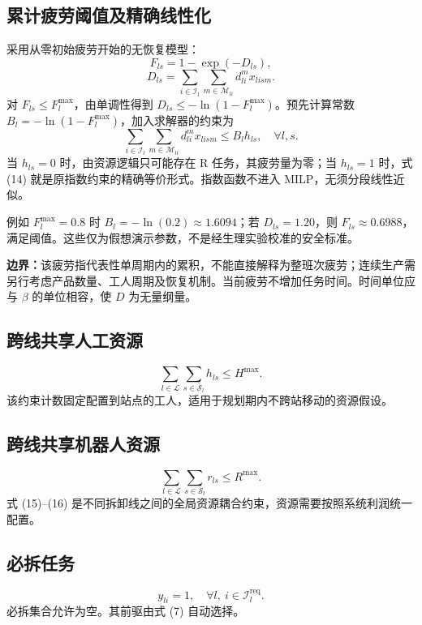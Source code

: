 \documentclass[UTF8,a4paper,11pt]{ctexart}
\begin{document}
\subsection{累计疲劳阈值及精确线性化}
采用从零初始疲劳开始的无恢复模型：
\begin{equation}
F_{ls}=1-\exp(-D_{ls}),\tag{12}
\end{equation}
\begin{equation}
D_{ls}=\sum_{i\in\mathcal I_l}\sum_{m\in\mathcal M_{li}}d_{li}^{m}x_{lism}.\tag{13}
\end{equation}
对 $F_{ls}\leq F_l^{\max}$，由单调性得到 $D_{ls}\leq -\ln(1-F_l^{\max})$。预先计算常数 $B_l=-\ln(1-F_l^{\max})$，加入求解器的约束为
\begin{equation}
\sum_{i\in\mathcal I_l}\sum_{m\in\mathcal M_{li}}d_{li}^{m}x_{lism}
\leq B_lh_{ls},\quad\forall l,s.\tag{14}
\end{equation}
当 $h_{ls}=0$ 时，由资源逻辑只可能存在 R 任务，其疲劳量为零；当 $h_{ls}=1$ 时，式 (14) 就是原指数约束的精确等价形式。指数函数不进入 MILP，无须分段线性近似。

例如 $F_l^{\max}=0.8$ 时 $B_l=-\ln(0.2)\approx1.6094$；若 $D_{ls}=1.20$，则 $F_{ls}\approx0.6988$，满足阈值。这些仅为假想演示参数，不是经生理实验校准的安全标准。

\textbf{边界：}该疲劳指代表性单周期内的累积，不能直接解释为整班次疲劳；连续生产需另行考虑产品数量、工人周期及恢复机制。当前疲劳不增加任务时间。时间单位应与 $\beta$ 的单位相容，使 $D$ 为无量纲量。

\subsection{跨线共享人工资源}
\begin{equation}
\sum_{l\in\mathcal L}\sum_{s\in\mathcal S_l}h_{ls}\leq H^{\max}.\tag{15}
\end{equation}
该约束计数固定配置到站点的工人，适用于规划期内不跨站移动的资源假设。

\subsection{跨线共享机器人资源}
\begin{equation}
\sum_{l\in\mathcal L}\sum_{s\in\mathcal S_l}r_{ls}\leq R^{\max}.\tag{16}
\end{equation}
式 (15)--(16) 是不同拆卸线之间的全局资源耦合约束，资源需要按照系统利润统一配置。

\subsection{必拆任务}
\begin{equation}
y_{li}=1,\quad\forall l,\ i\in\mathcal I_l^{\mathrm{req}}.\tag{17}
\end{equation}
必拆集合允许为空。其前驱由式 (7) 自动选择。
\end{document}
